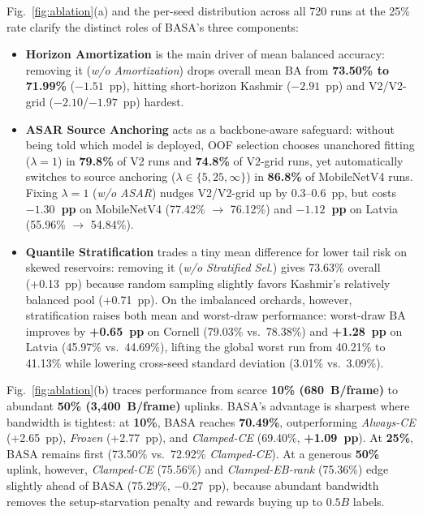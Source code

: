 \documentclass[preprint,12pt,authoryear]{elsarticle}
\newcommand{\BA}{\mathrm{BA}}
\begin{document}
Fig.~\ref{fig:ablation}(a) and the per-seed distribution across all 720 runs at the 25\% rate clarify the distinct roles of BASA's three components:
\begin{itemize}
  \item \textbf{Horizon Amortization} is the main driver of mean balanced accuracy: removing it (\emph{w/o Amortization}) drops overall mean $\BA$ from \textbf{73.50\% to 71.99\%} ($-1.51$~pp), hitting short-horizon Kashmir ($-2.91$~pp) and V2/V2-grid ($-2.10$/$-1.97$~pp) hardest.
  \item \textbf{ASAR Source Anchoring} acts as a backbone-aware safeguard: without being told which model is deployed, OOF selection chooses unanchored fitting ($\lambda = 1$) in \textbf{79.8\%} of V2 runs and \textbf{74.8\%} of V2-grid runs, yet automatically switches to source anchoring ($\lambda \in \{5, 25, \infty\}$) in \textbf{86.8\%} of MobileNetV4 runs. Fixing $\lambda = 1$ (\emph{w/o ASAR}) nudges V2/V2-grid up by 0.3--0.6~pp, but costs \textbf{$-1.30$~pp} on MobileNetV4 (77.42\% $\to$ 76.12\%) and \textbf{$-1.12$~pp} on Latvia (55.96\% $\to$ 54.84\%).
  \item \textbf{Quantile Stratification} trades a tiny mean difference for lower tail risk on skewed reservoirs: removing it (\emph{w/o Stratified Sel.}) gives 73.63\% overall (+0.13~pp) because random sampling slightly favors Kashmir's relatively balanced pool (+0.71~pp). On the imbalanced orchards, however, stratification raises both mean and worst-draw performance: worst-draw $\BA$ improves by \textbf{+0.65~pp} on Cornell (79.03\% vs.\ 78.38\%) and \textbf{+1.28~pp} on Latvia (45.97\% vs.\ 44.69\%), lifting the global worst run from 40.21\% to 41.13\% while lowering cross-seed standard deviation (3.01\% vs.\ 3.09\%).
\end{itemize}

Fig.~\ref{fig:ablation}(b) traces performance from scarce \textbf{10\% (680~B/frame)} to abundant \textbf{50\% (3,400~B/frame)} uplinks. BASA's advantage is sharpest where bandwidth is tightest: at \textbf{10\%}, BASA reaches \textbf{70.49\%}, outperforming \emph{Always-CE} (+2.65~pp), \emph{Frozen} (+2.77~pp), and \emph{Clamped-CE} (69.40\%, \textbf{+1.09~pp}). At \textbf{25\%}, BASA remains first (73.50\% vs.\ 72.92\% \emph{Clamped-CE}). At a generous \textbf{50\%} uplink, however, \emph{Clamped-CE} (75.56\%) and \emph{Clamped-EB-rank} (75.36\%) edge slightly ahead of BASA (75.29\%, $-0.27$~pp), because abundant bandwidth removes the setup-starvation penalty and rewards buying up to $0.5B$ labels.
\end{document}
